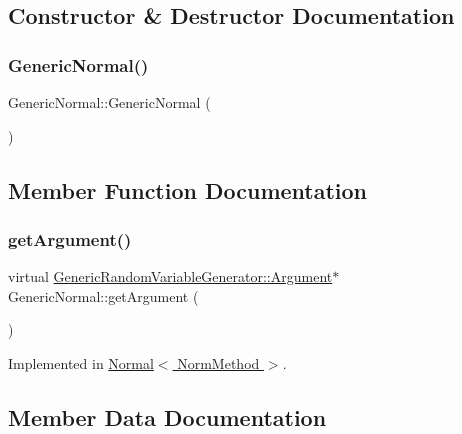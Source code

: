 \subsection{Constructor \& Destructor Documentation}
\hypertarget{class_generic_normal_ae835b7fa40969da5cab6425fb6a12a26}{}\label{class_generic_normal_ae835b7fa40969da5cab6425fb6a12a26} 
\subsubsection{\texorpdfstring{Generic\+Normal()}{GenericNormal()}}
{\footnotesize\ttfamily Generic\+Normal\+::\+Generic\+Normal (\begin{DoxyParamCaption}{ }\end{DoxyParamCaption})\hspace{0.3cm}{\ttfamily [inline]}}



\subsection{Member Function Documentation}
\hypertarget{class_generic_normal_a3006d271c692bc02b64b538342592e4d}{}\label{class_generic_normal_a3006d271c692bc02b64b538342592e4d} 
\subsubsection{\texorpdfstring{get\+Argument()}{getArgument()}}
{\footnotesize\ttfamily virtual \hyperlink{class_generic_random_variable_generator_1_1_argument}{Generic\+Random\+Variable\+Generator\+::\+Argument}$\ast$ Generic\+Normal\+::get\+Argument (\begin{DoxyParamCaption}{ }\end{DoxyParamCaption})\hspace{0.3cm}{\ttfamily [pure virtual]}}



Implemented in \hyperlink{class_normal_ac4048e25ff218cfb6052bd1b022b1591}{Normal$<$ Norm\+Method $>$}.



\subsection{Member Data Documentation}
\hypertarget{class_generic_normal_a9fe590cf9e7fd6693a040b513b3e58d2}{}\label{class_generic_normal_a9fe590cf9e7fd6693a040b513b3e58d2} 
